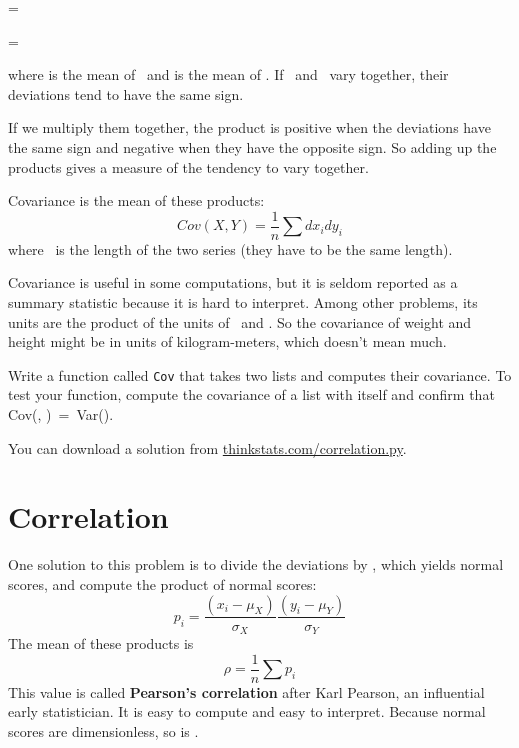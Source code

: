 \documentclass[12pt]{book}
\begin{document}
\quad \dd\x{} = \x{}~\minus~\mymu{}

\quad \dd\y{} = \y{}~\minus~\mymu{}

where \mymu {} is the mean of \X~and \mymu {} is the mean of \Y.
If \X~and \Y~vary together, their deviations tend to have the same
sign.

If we multiply them together, the product is positive when the
deviations have the same sign and negative when they have the opposite
sign.  So adding up the products gives a measure of the tendency to
vary together.

Covariance is the mean of these products:
%
\[ Cov(X,Y) = \frac{1}{n} \sum dx_i dy_i \]
%
where \n~is the length of the two series (they have to be the same
length).

Covariance is useful in some computations, but
it is seldom reported as a summary statistic because it is hard to
interpret.  Among other problems, its units are the product of the
units of \X~and \Y.  So the covariance of weight and height might be
in units of kilogram-meters, which doesn't mean much.

\begin{exercise}
Write a function called {\tt Cov} that takes two lists
and computes their covariance.  To test your function, compute
the covariance of a list with itself and confirm that
Cov(\X, \X)~=~Var(\X).

You can download a solution from
\url{thinkstats.com/correlation.py}.

\end{exercise}


\section{Correlation}

One solution to this problem is to divide the deviations by \mysigma,
which yields normal scores, and compute the product of normal scores:
%
\[ p_i = \frac{(x_i - \mu_X)}{\sigma_X} \frac{(y_i - \mu_Y)}{\sigma_Y} \]
%
The mean of these products is
%
\[ \rho = \frac{1}{n} \sum p_i \]
%
This value is called {\bf Pearson's correlation} after Karl Pearson,
an influential early statistician.  It is easy to compute and easy to
interpret.  Because normal scores are dimensionless, so is \myrho.
\end{document}
